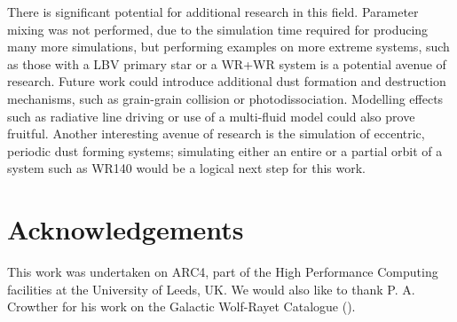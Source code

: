 There is significant potential for additional research in this field.
Parameter mixing was not performed, due to the simulation time required for producing many more simulations, but performing examples on more extreme systems, such as those with a LBV primary star or a WR+WR system is a potential avenue of research.
Future work could introduce additional dust formation and destruction mechanisms, such as grain-grain collision or photodissociation.
Modelling effects such as radiative line driving or use of a multi-fluid model could also prove fruitful. 
Another interesting avenue of research is the simulation of eccentric, periodic dust forming systems; simulating either an entire or a partial orbit of a system such as WR140 would be a logical next step for this work.

\section*{Acknowledgements}

This work was undertaken on ARC4, part of the High Performance Computing facilities at the University of Leeds, UK.
We would also like to thank P. A. Crowther for his work on the Galactic Wolf-Rayet Catalogue ().